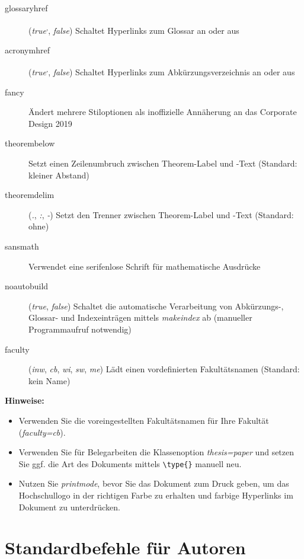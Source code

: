 \documentclass[
%
	thesis=paper,		%
	compactlistof,		%
	noauthorship,		%
%
	fancy,				%
%
%
]{hsmw-thesis}
\begin{document}
\begin{description}
		\item[glossaryhref] (\textit{true}\textsuperscript{,}, \textit{false}) Schaltet Hyperlinks zum Glossar an oder aus
		\item[acronymhref] (\textit{true}\textsuperscript{,}, \textit{false}) Schaltet Hyperlinks zum Abkürzungsverzeichnis an oder aus
		\item[fancy] Ändert mehrere Stiloptionen als inoffizielle Annäherung an das Corporate Design 2019
		\item[theorembelow] Setzt einen Zeilenumbruch zwischen Theorem-Label und -Text (Standard: kleiner Abstand)
		\item[theoremdelim] (\textit{.}, \textit{:}, \textit{-}) Setzt den Trenner zwischen Theorem-Label und -Text (Standard: ohne)
		\item[sansmath] Verwendet eine serifenlose Schrift für mathematische Ausdrücke
		\item[noautobuild] (\textit{true}, \textit{false}) Schaltet die automatische Verarbeitung von Abkürzungs-, Glossar- und Indexeinträgen mittels \textit{makeindex} ab (manueller Programmaufruf notwendig)
		\item[faculty] (\textit{inw}, \textit{cb}, \textit{wi}, \textit{sw}, \textit{me}) Lädt einen vordefinierten Fakultätsnamen (Standard: kein Name)
	\end{description}
	
	\textbf{Hinweise:}
	\begin{itemize}
		\item Verwenden Sie die voreingestellten Fakultätsnamen für Ihre Fakultät (\textit{faculty=cb}).
		\item Verwenden Sie für Belegarbeiten die Klassenoption \textit{thesis=paper} und setzen Sie ggf. die Art des Dokuments mittels \verb|\type{}| manuell neu.
		\item Nutzen Sie \textit{printmode}, bevor Sie das Dokument zum Druck geben, um das Hochschullogo in der richtigen Farbe zu erhalten und farbige Hyperlinks im Dokument zu unterdrücken.
	\end{itemize}
	
	
	
	\section{Standardbefehle für Autoren}
	\label{sec:macros}
	
\end{document}
